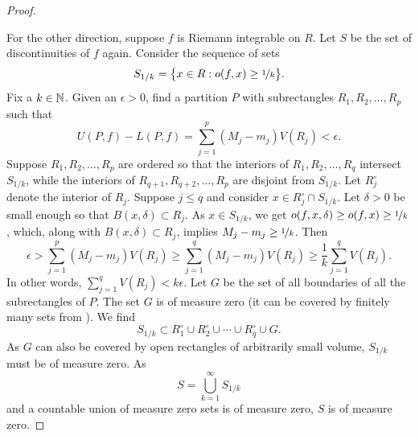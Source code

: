 \begin{proof}
\begin{myfigureht}
\caption{A rectangle $R$ with $S_\epsilon$ marked as thick black line, and the
$O_\ell$ as shaded rectangles.  The partition is given by the dotted
lines.  Note how the $R_j$ partition the $O_\ell$.\label{fig:nullsetintegrate}}
\end{myfigureht}

\medskip

\pagebreak[2]
For the other direction, suppose $f$ is Riemann integrable
on $R$.
Let $S$ be the set of discontinuities of $f$ again.  Consider
the sequence of sets
\begin{equation*}
S_{1/k} = \bigl\{ x \in R : o(f,x) \geq \nicefrac{1}{k} \bigr\}.
\end{equation*}
Fix a $k \in {\mathbb{N}}$.
Given an $\epsilon > 0$, find a partition $P$ with subrectangles
$R_1,R_2,\ldots,R_p$ such that
\begin{equation*}
U(P,f)-L(P,f) =
\sum_{j=1}^p (M_j-m_j) V(R_j)
< \epsilon .
\end{equation*}
Suppose $R_1,R_2,\ldots,R_p$ are ordered so that
the interiors of $R_1,R_2,\ldots,R_{q}$ intersect $S_{1/k}$,
while the interiors of $R_{q+1},R_{q+2},\ldots,R_p$
are disjoint from $S_{1/k}$.
Let $R_j^\circ$ denote the interior of $R_j$.
Suppose $j \leq q$ and consider
$x \in R_j^\circ \cap S_{1/k}$.
Let $\delta > 0$ be small enough so that $B(x,\delta) \subset R_j$.
As $x \in S_{1/k}$, we get $o(f,x,\delta) \geq o(f,x) \geq \nicefrac{1}{k}$,
which, along with $B(x,\delta) \subset R_j$, implies
$M_j-m_j \geq \nicefrac{1}{k}$.
Then
\begin{equation*}
\epsilon >
\sum_{j=1}^p (M_j-m_j) V(R_j)
\geq
\sum_{j=1}^q (M_j-m_j) V(R_j)
\geq
\frac{1}{k}
\sum_{j=1}^q V(R_j) .
\end{equation*}
In other words,
$\sum_{j=1}^q V(R_j) < k \epsilon$.
Let $G$ be the set of all boundaries of all the subrectangles
of $P$.  The set $G$ is of measure zero (it can be covered by
finitely many sets from ).
We find
\begin{equation*}
S_{1/k} \subset R_1^\circ \cup R_2^\circ \cup \cdots \cup R_q^\circ \cup G .
\end{equation*}
As $G$ can also be covered by open rectangles of arbitrarily small volume,
$S_{1/k}$ must be of measure zero.  As
\begin{equation*}
S = \bigcup_{k=1}^\infty S_{1/k}
\end{equation*}
and a countable union of measure zero sets is of measure zero, 
$S$ is of measure zero.
\end{proof}

